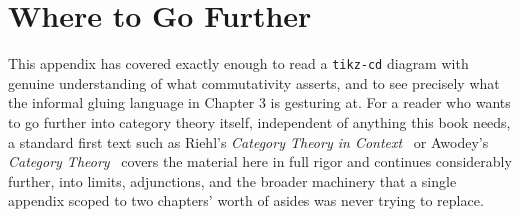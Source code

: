 \hypertarget{b.6-where-to-go-further}{%
\section{Where to Go Further}\label{b.6-where-to-go-further}}

This appendix has covered exactly enough to read a \texttt{tikz-cd} diagram with genuine understanding of what commutativity asserts, and to see precisely what the informal gluing language in Chapter 3 is gesturing at. For a reader who wants to go further into category theory itself, independent of anything this book needs, a standard first text such as Riehl's \emph{Category Theory in Context}~\cite{riehl2016category} or Awodey's \emph{Category Theory}~\cite{awodey2010category} covers the material here in full rigor and continues considerably further, into limits, adjunctions, and the broader machinery that a single appendix scoped to two chapters' worth of asides was never trying to replace.
